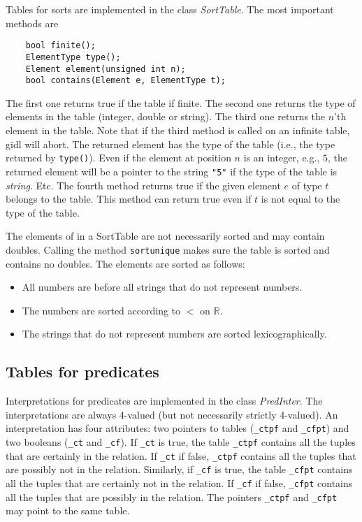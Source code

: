 \documentclass{article}
\newcommand{\gidl}{{\sc gidl}\xspace}
\begin{document}
Tables for sorts are implemented in the class \emph{SortTable}. The most important methods are 
\begin{lstlisting}
	bool finite();
	ElementType type();
	Element element(unsigned int n);
	bool contains(Element e, ElementType t);
\end{lstlisting}
The first one returns true if the table if finite. The second one returns the type of elements in the table (integer, double or string). The third one returns the $n$'th element in the table. Note that if the third method is called on an infinite table, \gidl will abort. The returned element has the type of the table (i.e., the type returned by \texttt{type()}). Even if the element at position $n$ is an integer, e.g., $5$, the returned element will be a pointer to the string \texttt{"5"} if the type of the table is \emph{string}. Etc. The fourth method returns true if the given element $e$ of type $t$ belongs to the table. This method can return true even if $t$ is not equal to the type of the table.

The elements of in a SortTable are not necessarily sorted and may contain doubles. Calling the method \texttt{sortunique} makes sure the table is sorted and contains no doubles. The elements are sorted as follows:
\begin{itemize}
	\item All numbers are before all strings that do not represent numbers.
	\item The numbers are sorted according to $<$ on $\mathbb{R}$.
	\item The strings that do not represent numbers are sorted lexicographically.
\end{itemize}

\subsection*{Tables for predicates}

Interpretations for predicates are implemented in the class \emph{PredInter}. The interpretations are always 4-valued (but not necessarily strictly 4-valued). An interpretation has four attributes: two pointers to tables (\texttt{\_ctpf} and \texttt{\_cfpt}) and two booleans (\texttt{\_ct} and \texttt{\_cf}). If \texttt{\_ct} is true, the table \texttt{\_ctpf} contains all the tuples that are certainly in the relation. If \texttt{\_ct} if false, \texttt{\_ctpf} contains all the tuples that are possibly not in the relation. Similarly, if \texttt{\_cf} is true, the table \texttt{\_cfpt} contains all the tuples that are certainly not in the relation. If \texttt{\_cf} if false, \texttt{\_cfpt} contains all the tuples that are possibly in the relation. The pointers \texttt{\_ctpf} and \texttt{\_cfpt} may point to the same table.
\end{document}
